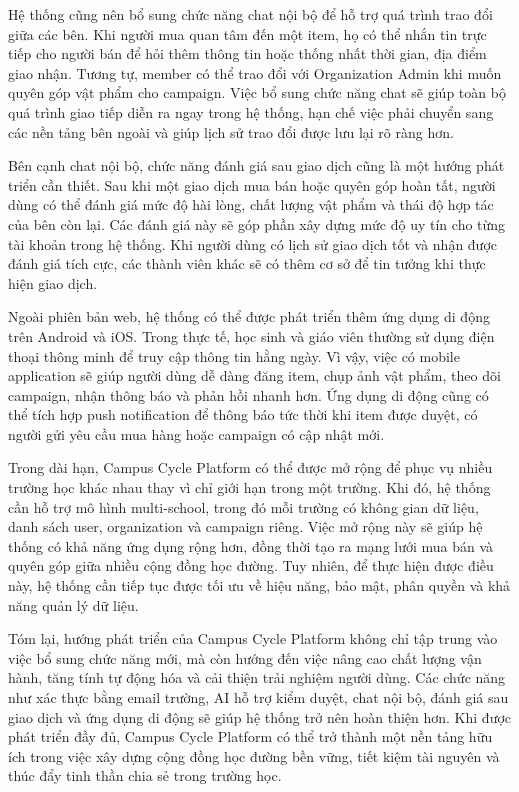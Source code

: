 \documentclass[12pt,a4paper]{report}
\begin{document}
Hệ thống cũng nên bổ sung chức năng chat nội bộ để hỗ trợ quá trình trao đổi giữa các bên. Khi người mua quan tâm đến một item, họ có thể nhắn tin trực tiếp cho người bán để hỏi thêm thông tin hoặc thống nhất thời gian, địa điểm giao nhận. Tương tự, member có thể trao đổi với Organization Admin khi muốn quyên góp vật phẩm cho campaign. Việc bổ sung chức năng chat sẽ giúp toàn bộ quá trình giao tiếp diễn ra ngay trong hệ thống, hạn chế việc phải chuyển sang các nền tảng bên ngoài và giúp lịch sử trao đổi được lưu lại rõ ràng hơn.

Bên cạnh chat nội bộ, chức năng đánh giá sau giao dịch cũng là một hướng phát triển cần thiết. Sau khi một giao dịch mua bán hoặc quyên góp hoàn tất, người dùng có thể đánh giá mức độ hài lòng, chất lượng vật phẩm và thái độ hợp tác của bên còn lại. Các đánh giá này sẽ góp phần xây dựng mức độ uy tín cho từng tài khoản trong hệ thống. Khi người dùng có lịch sử giao dịch tốt và nhận được đánh giá tích cực, các thành viên khác sẽ có thêm cơ sở để tin tưởng khi thực hiện giao dịch.

Ngoài phiên bản web, hệ thống có thể được phát triển thêm ứng dụng di động trên Android và iOS. Trong thực tế, học sinh và giáo viên thường sử dụng điện thoại thông minh để truy cập thông tin hằng ngày. Vì vậy, việc có mobile application sẽ giúp người dùng dễ dàng đăng item, chụp ảnh vật phẩm, theo dõi campaign, nhận thông báo và phản hồi nhanh hơn. Ứng dụng di động cũng có thể tích hợp push notification để thông báo tức thời khi item được duyệt, có người gửi yêu cầu mua hàng hoặc campaign có cập nhật mới.

Trong dài hạn, Campus Cycle Platform có thể được mở rộng để phục vụ nhiều trường học khác nhau thay vì chỉ giới hạn trong một trường. Khi đó, hệ thống cần hỗ trợ mô hình multi-school, trong đó mỗi trường có không gian dữ liệu, danh sách user, organization và campaign riêng. Việc mở rộng này sẽ giúp hệ thống có khả năng ứng dụng rộng hơn, đồng thời tạo ra mạng lưới mua bán và quyên góp giữa nhiều cộng đồng học đường. Tuy nhiên, để thực hiện được điều này, hệ thống cần tiếp tục được tối ưu về hiệu năng, bảo mật, phân quyền và khả năng quản lý dữ liệu.

Tóm lại, hướng phát triển của Campus Cycle Platform không chỉ tập trung vào việc bổ sung chức năng mới, mà còn hướng đến việc nâng cao chất lượng vận hành, tăng tính tự động hóa và cải thiện trải nghiệm người dùng. Các chức năng như xác thực bằng email trường, AI hỗ trợ kiểm duyệt, chat nội bộ, đánh giá sau giao dịch và ứng dụng di động sẽ giúp hệ thống trở nên hoàn thiện hơn. Khi được phát triển đầy đủ, Campus Cycle Platform có thể trở thành một nền tảng hữu ích trong việc xây dựng cộng đồng học đường bền vững, tiết kiệm tài nguyên và thúc đẩy tinh thần chia sẻ trong trường học.
\end{document}
